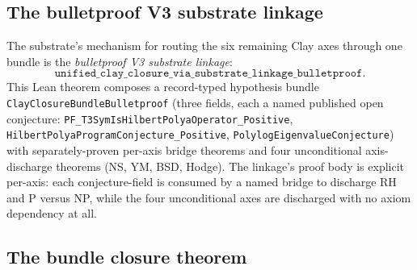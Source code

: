 \documentclass[11pt,a4paper]{amsart}
\theoremstyle{plain}
\theoremstyle{definition}
\begin{document}
\subsection{The bulletproof V3 substrate linkage}

The substrate's mechanism for routing the six remaining Clay axes through one bundle is the \emph{bulletproof V3 substrate linkage}:
\[
\texttt{unified\_clay\_closure\_via\_substrate\_linkage\_bulletproof}.
\]
This Lean theorem composes a record-typed hypothesis bundle \texttt{ClayClosureBundleBulletproof} (three fields, each a named published open conjecture: \texttt{PF\_T3SymIsHilbertPolyaOperator\_Positive}, \texttt{HilbertPolyaProgramConjecture\_Positive}, \texttt{PolylogEigenvalueConjecture}) with separately-proven per-axis bridge theorems and four unconditional axis-discharge theorems (NS, YM, BSD, Hodge). The linkage's proof body is explicit per-axis: each conjecture-field is consumed by a named bridge to discharge RH and P versus NP, while the four unconditional axes are discharged with no axiom dependency at all.

\subsection{The bundle closure theorem}
\end{document}
